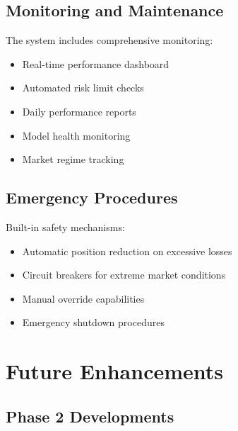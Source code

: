 \documentclass[11pt,a4paper]{article}
\begin{document}
\subsection{Monitoring and Maintenance}

The system includes comprehensive monitoring:

\begin{itemize}
    \item Real-time performance dashboard
    \item Automated risk limit checks
    \item Daily performance reports
    \item Model health monitoring
    \item Market regime tracking
\end{itemize}

\subsection{Emergency Procedures}

Built-in safety mechanisms:
\begin{itemize}
    \item Automatic position reduction on excessive losses
    \item Circuit breakers for extreme market conditions
    \item Manual override capabilities
    \item Emergency shutdown procedures
\end{itemize}

\section{Future Enhancements}

\subsection{Phase 2 Developments}
\end{document}
